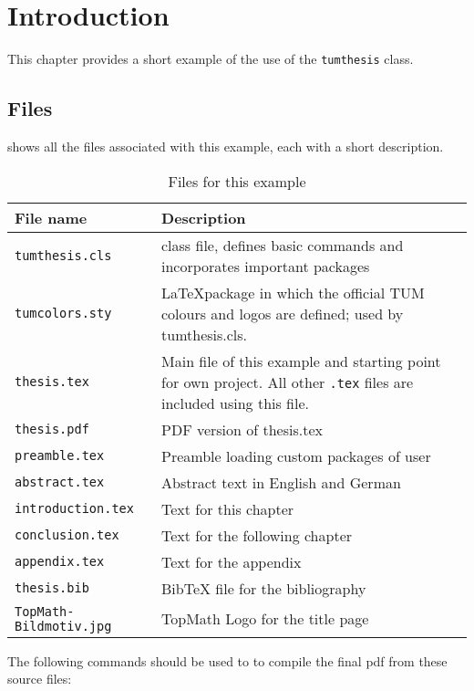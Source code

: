 \chapter{Introduction}
\label{ch:introduction}
This chapter provides a short example of the use of the \texttt{tumthesis} class.

\section{Files}
\label{sec:intro:files}

 shows all the files associated with this example, each with a short description.

\begin{table}[htb]
  \centering
  \begin{tabular}{lp{10cm}} 
    \toprule
    \textbf{File name} & \textbf{Description} \\ \midrule
    \texttt{tumthesis.cls} & class file, defines basic commands and incorporates important packages\\
    \texttt{tumcolors.sty} & \LaTeX package in which the official TUM colours and logos are defined; used by tumthesis.cls.\\
    \texttt{thesis.tex} & Main file of this example and starting point for own project. All other \texttt{.tex} files are included using this file.\\
    \texttt{thesis.pdf} & PDF version of thesis.tex\\
		\texttt{preamble.tex} & Preamble loading custom packages of user\\
    \texttt{abstract.tex} & Abstract text in English and German\\
    \texttt{introduction.tex} & Text for this chapter\\
    \texttt{conclusion.tex} & Text for the following chapter\\
    \texttt{appendix.tex} & Text for the appendix\\
    \texttt{thesis.bib} & Bib\TeX{} file for the bibliography\\
		\texttt{TopMath-Bildmotiv.jpg} & TopMath Logo for the title page\\
    \bottomrule
  \end{tabular} 
  \caption{Files for this example}
  \label{tab:intro:files}
\end{table}

The following commands should be used to to compile the final pdf from these source files:

